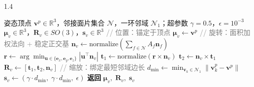 \begin{algorithm}[htbp]
    \begin{spacing}{1.4}
    \caption{顶点高斯属性解析推导算法}
    \label{alg:vertex_gaussian}
    \begin{algorithmic}[1]
        \REQUIRE 姿态顶点 $\mathbf{v}^p \in \mathbb{R}^3$，邻接面片集合 $\mathcal{N}$，一环邻域 $\mathcal{N}_1$；超参数 $\gamma = 0.5$，$\epsilon = 10^{-3}$
        \ENSURE $\boldsymbol{\mu}_v \in \mathbb{R}^3$，$\mathbf{R}_v \in SO(3)$，$\mathbf{s}_v \in \mathbb{R}^3$
        \STATE \textcolor{gray}{// 位置：锚定于顶点}
        \STATE $\boldsymbol{\mu}_v \leftarrow \mathbf{v}^p$
        \STATE \textcolor{gray}{// 旋转：面积加权法向 + 稳定正交基}
        \STATE $\mathbf{n}_v \leftarrow \text{normalize}(\sum_{f \in \mathcal{N}} A_f \mathbf{n}_f)$
        \STATE $\mathbf{r} \leftarrow \arg\min_{\mathbf{u} \in \{\mathbf{e}_x, \mathbf{e}_y, \mathbf{e}_z\}} |\mathbf{u}^\top \mathbf{n}_v|$
        \STATE $\mathbf{t}_1 \leftarrow \text{normalize}(\mathbf{r} \times \mathbf{n}_v)$
        \STATE $\mathbf{t}_2 \leftarrow \mathbf{n}_v \times \mathbf{t}_1$
        \STATE $\mathbf{R}_v \leftarrow [\mathbf{t}_1, \mathbf{t}_2, \mathbf{n}_v]$
        \STATE \textcolor{gray}{// 缩放：绑定最短邻域边长}
        \STATE $d_{\min} \leftarrow \min_{\mathbf{v}_k \in \mathcal{N}_1} \|\mathbf{v}_k^p - \mathbf{v}^p\|$
        \STATE $\mathbf{s}_v \leftarrow (\gamma \cdot d_{\min},\; \gamma \cdot d_{\min},\; \epsilon)$
        \STATE \textbf{返回} $\boldsymbol{\mu}_v,\; \mathbf{R}_v,\; \mathbf{s}_v$
    \end{algorithmic}
    \end{spacing}
\end{algorithm}